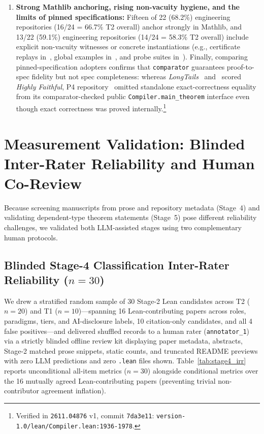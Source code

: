 \documentclass[11pt,letterpaper]{article}
\begin{document}
\begin{enumerate}
  \item \textbf{Strong Mathlib anchoring, rising non-vacuity hygiene, and the limits of pinned specifications:} Fifteen of 22 (68.2\%) engineering repositories (16/24 = 66.7\% T2 overall) anchor strongly in Mathlib, and 13/22 (59.1\%) engineering repositories (14/24 = 58.3\% T2 overall) include explicit non-vacuity witnesses or concrete instantiations (e.g., certificate replays in~\cite{arxiv2611_26140}, global examples in~\cite{arxiv2611_16781}, and probe suites in~\cite{arxiv2611_12585}). Finally, comparing pinned-specification adopters confirms that \texttt{comparator} guarantees proof-to-spec fidelity but not spec completeness: whereas \emph{LongTails}~\cite{arxiv2611_13872} and~\cite{arxiv2611_11805} scored \emph{Highly Faithful}, P4 repository~\cite{arxiv2611_04876} omitted standalone exact-correctness equality from its comparator-checked public \texttt{Compiler.main\_theorem} interface even though exact correctness was proved internally.\footnote{Verified in \texttt{2611.04876} v1, commit \texttt{7da3e11}: \texttt{version-1.0/lean/Compiler.lean:1936-1978}.}
\end{enumerate}

\section{Measurement Validation: Blinded Inter-Rater Reliability and Human Co-Review}
\label{sec:human_irr}

Because screening manuscripts from prose and repository metadata (Stage~4) and validating dependent-type theorem statements (Stage~5) pose different reliability challenges, we validated both LLM-assisted stages using two complementary human protocols.

\subsection{Blinded Stage-4 Classification Inter-Rater Reliability (\texorpdfstring{$n = 30$}{n = 30})}
We drew a stratified random sample of 30 Stage-2 Lean candidates across T2 ($n = 20$) and T1 ($n = 10$)---spanning 16 Lean-contributing papers across roles, paradigms, tiers, and AI-disclosure labels, 10 citation-only candidates, and all 4 false positives---and delivered shuffled records to a human rater (\texttt{annotator\_1}) via a strictly blinded offline review kit displaying paper metadata, abstracts, Stage-2 matched prose snippets, static counts, and truncated README previews with zero LLM predictions and zero \texttt{.lean} files shown. Table~\ref{tab:stage4_irr} reports unconditional all-item metrics ($n = 30$) alongside conditional metrics over the 16 mutually agreed Lean-contributing papers (preventing trivial non-contributor agreement inflation).
\end{document}
